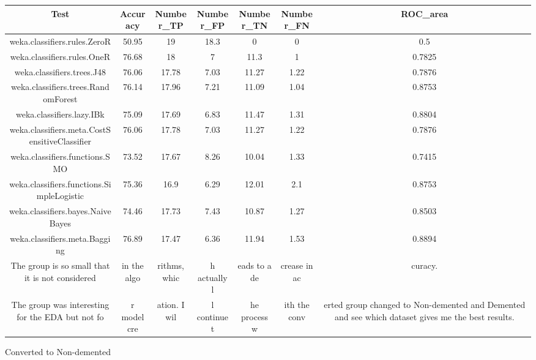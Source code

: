 \documentclass[
]{article}
\begin{document}
\begin{longtable}[]{@{}ccccccc@{}}
\toprule()
Test & Accuracy & Number\_TP & Number\_FP & Number\_TN & Number\_FN &
ROC\_area \\
\midrule()
\endhead
weka.classifiers.rules.ZeroR & 50.95 & 19 & 18.3 & 0 & 0 & 0.5 \\
weka.classifiers.rules.OneR & 76.68 & 18 & 7 & 11.3 & 1 & 0.7825 \\
weka.classifiers.trees.J48 & 76.06 & 17.78 & 7.03 & 11.27 & 1.22 &
0.7876 \\
weka.classifiers.trees.RandomForest & 76.14 & 17.96 & 7.21 & 11.09 &
1.04 & 0.8753 \\
weka.classifiers.lazy.IBk & 75.09 & 17.69 & 6.83 & 11.47 & 1.31 &
0.8804 \\
weka.classifiers.meta.CostSensitiveClassifier & 76.06 & 17.78 & 7.03 &
11.27 & 1.22 & 0.7876 \\
weka.classifiers.functions.SMO & 73.52 & 17.67 & 8.26 & 10.04 & 1.33 &
0.7415 \\
weka.classifiers.functions.SimpleLogistic & 75.36 & 16.9 & 6.29 & 12.01
& 2.1 & 0.8753 \\
weka.classifiers.bayes.NaiveBayes & 74.46 & 17.73 & 7.43 & 10.87 & 1.27
& 0.8503 \\
weka.classifiers.meta.Bagging & 76.89 & 17.47 & 6.36 & 11.94 & 1.53 &
0.8894 \\
The group is so small that it is not considered & in the algo & rithms,
whic & h actually l & eads to a de & crease in ac & curacy. \\
The group was interesting for the EDA but not fo & r model cre & ation.
I wil & l continue t & he process w & ith the conv & erted group changed
to Non-demented and Demented and see which dataset gives me the best
results. \\
\bottomrule()
\end{longtable}

Converted to Non-demented
\end{document}
